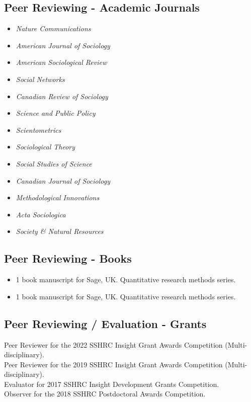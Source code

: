 \documentclass[11pt, a4paper]{article}
\newcommand{\note}[1]{\marginnote{\scriptsize #1}}
\begin{document}
\subsection*{Peer Reviewing - Academic Journals}
\begin{itemize}[noitemsep]
      \item \emph{Nature Communications}
      \item \emph{American Journal of Sociology}
      \item \emph{American Sociological Review}
      \item \emph{Social Networks}
      \item \emph{Canadian Review of Sociology}
      \item \emph{Science and Public Policy}
      \item \emph{Scientometrics}
      \item \emph{Sociological Theory}
      \item \emph{Social Studies of Science}
      \item \emph{Canadian Journal of Sociology}
      \item \emph{Methodological Innovations}
      \item \emph{Acta Sociologica}
      \item \emph{Society \& Natural Resources}
  \end{itemize}

\subsection*{Peer Reviewing - Books}
\begin{itemize}[noitemsep]
      \item 1 book manuscript for Sage, UK. Quantitative research
methods series.
      \item 1 book manuscript for Sage, UK. Quantitative research
methods series.
  \end{itemize}

\subsection*{Peer Reviewing / Evaluation - Grants}
    \note{2022}Peer Reviewer for the 2022 SSHRC Insight Grant Awards
Competition (Multi-disciplinary).\\[.2cm]
    \note{2019}Peer Reviewer for the 2019 SSHRC Insight Grant Awards
Competition (Multi-disciplinary).\\[.2cm]
    \note{2018}Evaluator for 2017 SSHRC Insight Development Grants
Competition.\\[.2cm]
    \note{2017}Observer for the 2018 SSHRC Postdoctoral Awards
Competition.\\[.2cm]
  
\end{document}
